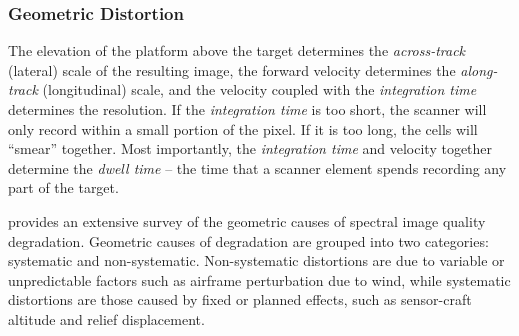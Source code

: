 \documentclass[10pt]{article}
\begin{document}





\subsubsection{Geometric Distortion}


The elevation of the platform above the target determines the \emph{across-track} (lateral) scale of the resulting image, the forward velocity determines the \emph{along-track} (longitudinal) scale, and the velocity coupled with the \emph{integration time} determines the resolution. If the \emph{integration time} is too short, the scanner will only record within a small portion of the pixel. If it is  too long, the cells will ``smear'' together. Most importantly, the \emph{integration time} and velocity together determine the \emph{dwell time} -- the time that a scanner element spends recording any part of the target. 


\cite{Gupta2018} provides an extensive survey of the geometric causes of spectral image quality degradation. Geometric causes of degradation are grouped into two categories: systematic and non-systematic. Non-systematic distortions are due to variable or unpredictable factors such as airframe perturbation due to wind, while systematic distortions are those caused by fixed or planned effects, such as sensor-craft altitude and relief displacement.
\end{document}
